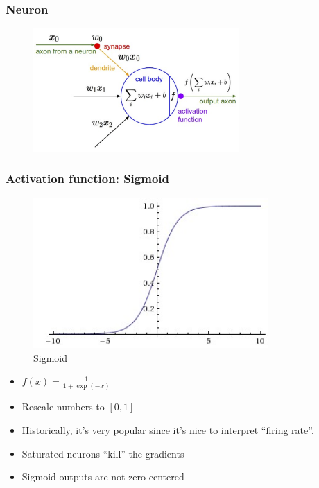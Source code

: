 \documentclass{beamer}
\begin{document}
\begin{frame}
  \frametitle{Neuron}

  \begin{figure}
    \centering
    \includegraphics[width=0.7\textwidth]{neuron.png}
  \end{figure}
\end{frame}

\begin{frame}
  \frametitle{Activation function: Sigmoid}

  \begin{minipage}{0.48\textwidth}
    \begin{figure}
      \centering
      \includegraphics[width=0.8\textwidth]{sigmoid.jpeg}
      \caption{Sigmoid}
    \end{figure}
  \end{minipage}
  \begin{minipage}{0.48\textwidth}
    \begin{itemize}
      \item $f(x)=\frac{1}{1+\exp(-x)}$
      \item[\ding{51}] Rescale numbers to $[0,1]$
      \item[\ding{51}] Historically, it's very popular since it's nice to interpret ``firing rate''.
      \item[\ding{55}] Saturated neurons ``kill'' the gradients
      \item[\ding{55}] Sigmoid outputs are not zero-centered
    \end{itemize}
  \end{minipage}
\end{frame}
\end{document}
